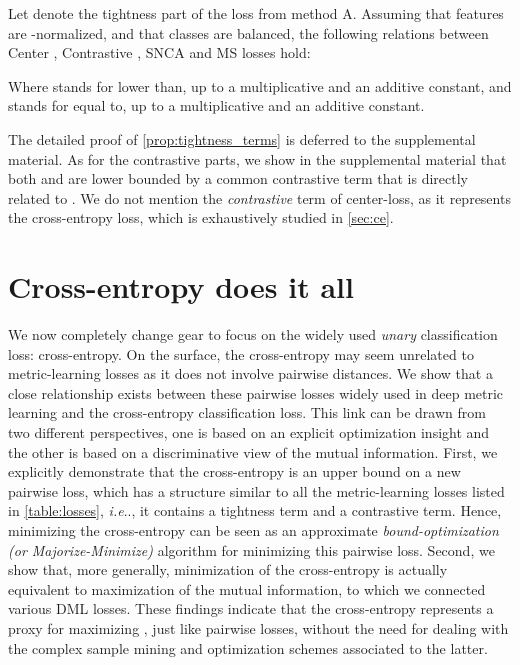 \documentclass[runningheads]{llncs}
\makeatletter
\DeclareRobustCommand\onedot{\futurelet\@let@token\@onedot}
\def\@onedot{\ifx\@let@token.\else.\null\fi\xspace}
\def\ie{\emph{i.e}\onedot} \def\Ie{\emph{I.e}\onedot}
\makeatother
\begin{document}
\begin{lemma}
\label{prop:tightness_terms}
Let  denote the tightness part of the loss from method A. Assuming  that features are -normalized, and that classes are balanced, the following relations between Center \cite{center_loss}, Contrastive \cite{hadsell2006dimensionality}, SNCA \cite{wu2018improving} and MS \cite{wang2019multi} losses hold:

Where  stands for lower than, up to a multiplicative and an additive constant, and  stands for equal to, up to a multiplicative and an additive constant.
\end{lemma}

The detailed proof of \autoref{prop:tightness_terms} is deferred to the supplemental material.
As for the contrastive parts, we show in the supplemental material that both  and  are lower bounded by a common contrastive term that is directly related to . We do not mention the \textit{contrastive} term of center-loss, as it represents the cross-entropy loss, which is exhaustively studied in \autoref{sec:ce}. \section{Cross-entropy does it all}\label{sec:ce}

We now completely change gear to focus on the widely used {\em unary} classification loss: cross-entropy. On the surface, the cross-entropy may seem unrelated to metric-learning losses as it does not involve pairwise distances. We show that a close relationship exists between these pairwise losses widely used in deep metric learning and the cross-entropy classification loss. This link can be drawn from two different perspectives, one is based on an explicit optimization insight and the other is based on a discriminative view of the mutual information. First, we explicitly demonstrate that the cross-entropy is an upper bound on a new pairwise loss, which has a structure similar to all the metric-learning losses listed in  \autoref{table:losses}, \ie, it contains a tightness term and a contrastive term. Hence, minimizing the cross-entropy can be seen as an approximate {\em bound-optimization (or Majorize-Minimize)} algorithm for minimizing this pairwise loss. Second, we show that, more generally, minimization of the cross-entropy is actually equivalent to maximization of the mutual information, to which we connected various DML losses. These findings indicate that the cross-entropy represents a proxy for maximizing , just like pairwise losses, without the need for dealing with the complex sample mining and optimization schemes associated to the latter.
\end{document}
